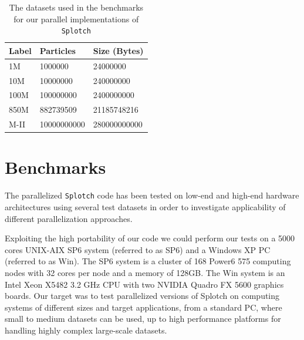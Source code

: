 

\begin{table}
\caption{The datasets used in the benchmarks for our parallel implementations of {\tt Splotch}}
\begin{center}
\begin{tabular}{|l|l|l|}
\hline
Label & 	Particles& 	Size (Bytes)  \\
\hline
1M   & 	1000000   & 24000000 \\
\hline
10M  & 	10000000  & 240000000 \\
\hline
100M & 	100000000 & 2400000000 \\
\hline
850M & 	882739509 & 21185748216 \\
\hline
M-II & 	10000000000 & 	280000000000 \\
\hline
\end{tabular}
\end{center}
\end{table}

\section{Benchmarks}

The parallelized {\tt Splotch} code has been tested on low-end and high-end hardware 
architectures using several test datasets in order to investigate applicability of 
different parallelization approaches.

Exploiting the high portability of our code we could perform our tests on a 
5000 cores UNIX-AIX  SP6 system (referred to as SP6) and a Windows XP PC (referred to as Win). 
The SP6 system is a cluster of 168 Power6 575 computing nodes with 32 cores per node 
and a memory of 128GB. The Win system is an Intel Xeon X5482 3.2 GHz CPU with 
two NVIDIA Quadro FX 5600 graphics boards. Our target was to test parallelized 
versions of Splotch on computing systems of different sizes and target applications, 
from a standard PC, where small to medium datasets can be used, up to high 
performance platforms for handling highly complex large-scale datasets.

